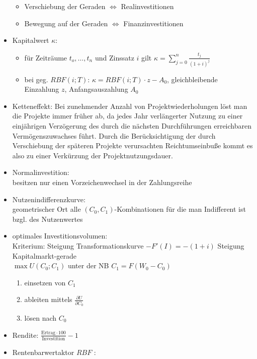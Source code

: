 \begin{itemize}
\begin{itemize}
				\item Verschiebung der Geraden $\Leftrightarrow$ Realinvestitionen
				\item Bewegung auf der Geraden $\Leftrightarrow$ Finanzinvestitionen
			\end{itemize}
		\item Kapitalwert $\kappa$: 
			\begin{itemize}
				\item für Zeiträume $t_o, \dots, t_n$ und Zinssatz $i$ gilt $\kappa=\sum_{j=0}^n \frac{t_j}{(1+i)^j}$ \label{Kapitalwert}
				\item bei geg. $RBF(i;T)$: $\kappa=RBF(i;T)\cdot z -A_0$, gleichbleibende Einzahlung $z$, Anfangsauszahlung $A_0$
			\end{itemize}
		\item Ketteneffekt: \label{Ketteneffekt}
			Bei zunehmender Anzahl von Projektwiederholungen löst man die Projekte immer früher ab, da jedes Jahr verlängerter Nutzung zu einer einjährigen Verzögerung des durch die nächsten Durchführungen erreichbaren Vermögenszuwachses führt. Durch die Berücksichtigung der durch Verschiebung der späteren Projekte verursachten Reichtumseinbuße kommt es also zu einer Verkürzung der Projektnutzungsdauer.
		\item Normalinvestition: \label{Normalinvestition}\\
			besitzen nur einen Vorzeichenwechsel in der Zahlungsreihe
		\item Nutzenindifferenzkurve: \label{Nutzenindifferenzkurve}\\
			geometrischer Ort alle $(C_0,C_1)$-Kombinationen für die man Indifferent ist bzgl. des Nutzenwertes
		\item optimales Investitionsvolumen: \\
			Kriterium: Steigung Transformationskurve $-F'(I) = -(1+i)$ Steigung Kapitalmarkt-gerade\\
			$\max U(C_0;C_1)$ unter der NB $C_1=F(W_0-C_0)$
			\begin{enumerate}
				\item einsetzen von $C_1$
				\item ableiten mittels $\frac{\partial U}{\partial C_0}$
				\item lösen nach $C_0$
			\end{enumerate}		
		\item Rendite: $\frac{\text{Ertrag}\cdot100}{\text{Investition}}-1$\label{Rendite}
		\item Rentenbarwertaktor $RBF$ \label{Rentenbarwertfaktor}:

\end{itemize}

